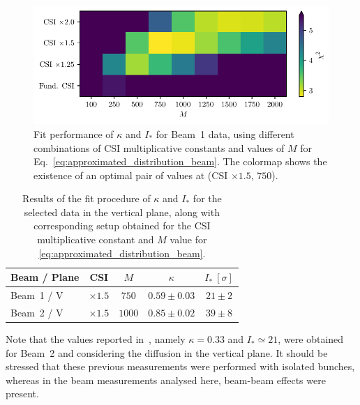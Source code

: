 \begin{figure}[hpt]
    \centering
    \includegraphics[trim={0 2.5mm 0 1.5mm}, clip, width=0.98\columnwidth]{5_Diffusion_measurement_LHC/figs/fourth.pdf}
    \caption{Fit performance of $\kappa$ and $I_\ast$ for Beam~1 data, using different combinations of CSI multiplicative constants and values of $M$ for Eq.~\eqref{eq:approximated_distribution_beam}. The colormap shows the existence of an optimal pair of values at (CSI $\times 1.5$, $750$).}
    \label{fig:fourth}
\end{figure}
%
\begin{table}[hpt]
    \centering
    \caption{Results of the fit procedure of $\kappa$ and $I_\ast$ for the selected data in the vertical plane, along with corresponding setup obtained for the CSI multiplicative constant and $M$ value for \eqref{eq:approximated_distribution_beam}.}
    \begin{tabular}{lcccc}
        \toprule
        Beam / Plane & CSI & $M$ & $\kappa$ & $I_\ast\ [\sigma]$ \\
        \midrule
        Beam~1 / V & $\times1.5$ & $750$ & $0.59\pm0.03$ & $21\pm2$ \\
        Beam~2 / V & $\times1.5$ & $1000$ & $0.85\pm0.02$ & $39\pm8$ \\
        \bottomrule
    \end{tabular}
    \label{tab:fit_results}
\end{table}
%

Note that the values reported in~\cite{bazzani2020diffusion}, namely $\kappa=0.33 $ and $I_\ast \simeq 21$, were obtained for Beam~2 and considering the diffusion in the vertical plane. It should be stressed that these previous measurements were performed with isolated bunches, whereas in the beam measurements analysed here, beam-beam effects were present.

